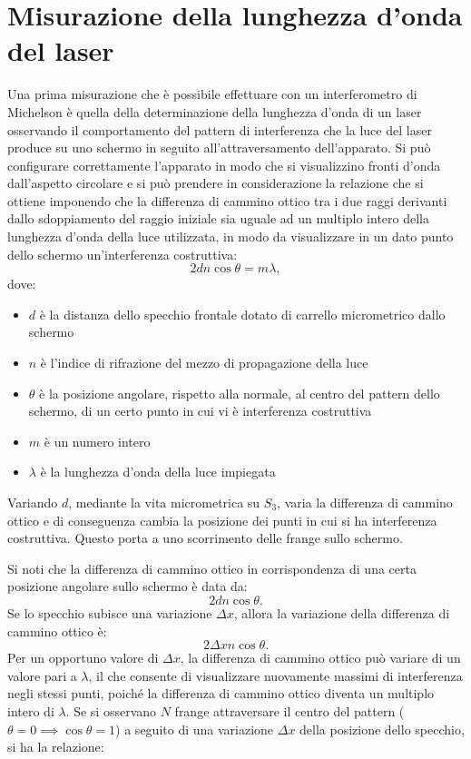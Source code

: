 \documentclass[a4paper,12pt]{article}
\begin{document}
\section{Misurazione della lunghezza d’onda del laser}
Una prima misurazione che è possibile effettuare con un interferometro di Michelson è quella della determinazione della lunghezza d’onda di un laser osservando il comportamento del pattern di interferenza che la luce del laser produce su uno schermo in seguito all’attraversamento dell’apparato. Si può configurare correttamente l’apparato in modo che si visualizzino fronti d’onda dall’aspetto circolare e si può prendere in considerazione la relazione che si ottiene imponendo che la differenza di cammino ottico tra i due raggi derivanti dallo sdoppiamento del raggio iniziale sia uguale ad un multiplo intero della lunghezza d’onda della luce utilizzata, in modo da visualizzare in un dato punto dello schermo un’interferenza costruttiva: 
\begin{equation}
2d n \cos\theta = m\lambda,
\label{eq:interferenza_costruttiva}
\end{equation}
dove:
\begin{itemize}
    \item \( d \) è la distanza dello specchio frontale dotato di carrello micrometrico dallo schermo
    \item \( n \) è l’indice di rifrazione del mezzo di propagazione della luce
    \item \( \theta \) è la posizione angolare, rispetto alla normale, al centro del pattern dello schermo, di un certo punto in cui vi è interferenza costruttiva
    \item \( m \) è un numero intero
    \item \( \lambda \) è la lunghezza d’onda della luce impiegata
\end{itemize}
Variando \( d \), mediante la vita micrometrica su \( S_3\), varia la differenza di cammino ottico e di conseguenza cambia la posizione dei punti in cui si ha interferenza costruttiva. Questo porta a uno scorrimento delle frange sullo schermo.

Si noti che la differenza di cammino ottico in corrispondenza di una certa posizione angolare sullo schermo è data da:
\begin{equation}
2d n \cos\theta.
\end{equation}
Se lo specchio subisce una variazione \( \Delta x \), allora la variazione della differenza di cammino ottico è:
\begin{equation}
2\Delta x n \cos\theta.
\label{eq:variazione_cammino}
\end{equation}
Per un opportuno valore di \( \Delta x \), la differenza di cammino ottico può variare di un valore pari a \( \lambda \), il che consente di visualizzare nuovamente massimi di interferenza negli stessi punti, poiché la differenza di cammino ottico diventa un multiplo intero di \( \lambda \).
Se si osservano \( N \) frange attraversare il centro del pattern (\( \theta = 0 \implies \cos\theta = 1 \)) a seguito di una variazione \( \Delta x \) della posizione dello specchio, si ha la relazione:
\end{document}
